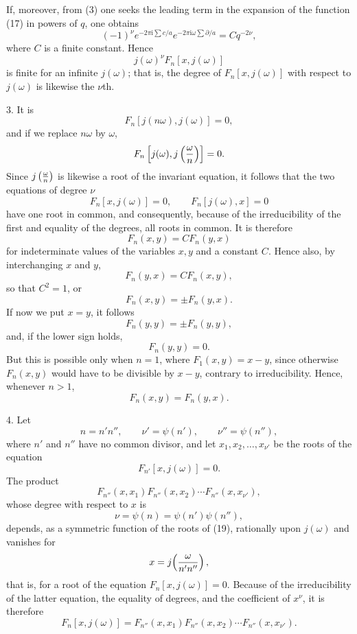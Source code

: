 \documentclass[11pt]{article}
\providecommand{\ii}{\mathrm{i}}
\begin{document}
If, moreover, from (3) one seeks the leading term in the expansion of the function (17) in powers of $q$, one obtains
\[
(-1)^\nu e^{-2\pi\ii\sum c/a}e^{-2\pi\ii\omega\sum \partial/a}=Cq^{-2\nu},
\]
where $C$ is a finite constant. Hence
\[
j(\omega)^\nu F_n[x,j(\omega)]
\]
is finite for an infinite $j(\omega)$; that is, the degree of $F_n[x,j(\omega)]$ with respect to $j(\omega)$ is likewise the $\nu$th.

3. It is
\[
F_n[j(n\omega),j(\omega)]=0,
\]
and if we replace $n\omega$ by $\omega$,
\[
F_n\left[j(\omega),j\left({\omega\over n}\right)\right]=0.
\]
Since $j\left({\omega\over n}\right)$ is likewise a root of the invariant equation, it follows that the two equations of degree $\nu$
\[
F_n[x,j(\omega)]=0,
\qquad
F_n[j(\omega),x]=0
\]
have one root in common, and consequently, because of the irreducibility of the first and equality of the degrees, all roots in common. It is therefore
\[
F_n(x,y)=CF_n(y,x)
\]
for indeterminate values of the variables $x,y$ and a constant $C$. Hence also, by interchanging $x$ and $y$,
\[
F_n(y,x)=CF_n(x,y),
\]
so that $C^2=1$, or
\[
F_n(x,y)=\pm F_n(y,x).
\]
If now we put $x=y$, it follows
\[
F_n(y,y)=\pm F_n(y,y),
\]
and, if the lower sign holds,
\[
F_n(y,y)=0.
\]
But this is possible only when $n=1$, where $F_1(x,y)=x-y$, since otherwise $F_n(x,y)$ would have to be divisible by $x-y$, contrary to irreducibility. Hence, whenever $n>1$,
\begin{equation}
F_n(x,y)=F_n(y,x).
\tag{18}
\end{equation}

4. Let
\[
n=n'n'',\qquad \nu'=\psi(n'),\qquad \nu''=\psi(n''),
\]
where $n'$ and $n''$ have no common divisor, and let $x_1,x_2,\ldots,x_{\nu'}$ be the roots of the equation
\begin{equation}
F_{n'}[x,j(\omega)]=0.
\tag{19}
\end{equation}
The product
\begin{equation}
F_{n''}(x,x_1)F_{n''}(x,x_2)\cdots F_{n''}(x,x_{\nu'}),
\tag{20}
\end{equation}
whose degree with respect to $x$ is
\[
\nu=\psi(n)=\psi(n')\psi(n''),
\]
depends, as a symmetric function of the roots of (19), rationally upon $j(\omega)$ and vanishes for
\[
x=j\!\left({\omega\over n'n''}\right),
\]
that is, for a root of the equation $F_n[x,j(\omega)]=0$. Because of the irreducibility of the latter equation, the equality of degrees, and the coefficient of $x^\nu$, it is therefore
\begin{equation}
F_n[x,j(\omega)]=F_{n''}(x,x_1)F_{n''}(x,x_2)\cdots F_{n''}(x,x_{\nu'}).
\tag{21}
\end{equation}
\end{document}
